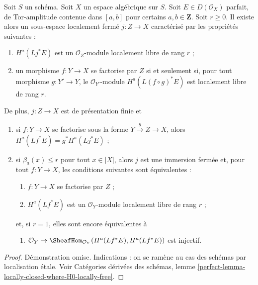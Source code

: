 \begin{lemma}
\label{lemma-locally-closed-where-H0-locally-free}
Soit $S$ un sch\'ema. Soit $X$ un espace alg\'ebrique sur $S$.
Soit $E\in D(\mathcal{O}_X)$ parfait, de Tor-amplitude contenue dans
$[a,b]$ pour certains $a,b\in\mathbf{Z}$.
Soit $r\geq0$.
Il existe alors un sous-espace localement ferm\'e $j:Z\to X$ caract\'eris\'e
par les propri\'et\'es suivantes :
\begin{enumerate}
\item $H^a(Lj^*E)$ est un $\mathcal{O}_Z$-module localement libre de rang $r$ ;
\item un morphisme $f:Y\to X$ se factorise par $Z$ si et seulement si, pour
tout morphisme $g:Y'\to Y$, le $\mathcal{O}_{Y'}$-module
$H^a(L(f\circ g)^*E)$ est localement libre de rang $r$.
\end{enumerate}
De plus, $j:Z\to X$ est de pr\'esentation finie et
\begin{enumerate}
\item[(3)] si $f:Y\to X$ se factorise sous la forme
$Y\xrightarrow{g}Z\to X$, alors
$H^a(Lf^*E)=g^*H^a(Lj^*E)$ ;
\item[(4)] si $\beta_a(x)\leq r$ pour tout $x\in|X|$, alors $j$ est une
immersion ferm\'ee et, pour tout $f:Y\to X$, les conditions suivantes sont
\'equivalentes :
\begin{enumerate}
\item $f:Y\to X$ se factorise par $Z$ ;
\item $H^a(Lf^*E)$ est un $\mathcal{O}_Y$-module localement libre de rang $r$ ;
\end{enumerate}
et, si $r=1$, elles sont encore \'equivalentes \`a
\begin{enumerate}
\item[(c)] $\mathcal{O}_Y\to
\SheafHom_{\mathcal{O}_Y}(H^a(Lf^*E),H^a(Lf^*E))$ est injectif.
\end{enumerate}
\end{enumerate}
\end{lemma}

\begin{proof}
D\'emonstration omise. Indications :
on se ram\`ene au cas des sch\'emas par localisation \'etale. Voir Cat\'egories
d\'eriv\'ees des sch\'emas, lemme
\ref{perfect-lemma-locally-closed-where-H0-locally-free}.
\end{proof}

